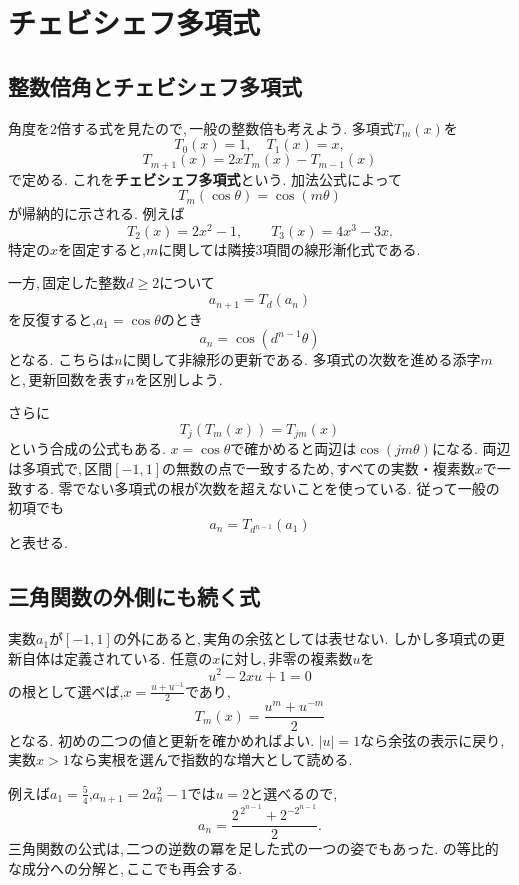 \section{チェビシェフ多項式}\label{節：チェビシェフ多項式}
\subsection{整数倍角とチェビシェフ多項式}

角度を2倍する式を見たので,\,一般の整数倍も考えよう.
多項式$T_m(x)$を
\[
 T_0(x)=1,\quad T_1(x)=x,
\]
\[
 T_{m+1}(x)=2xT_m(x)-T_{m-1}(x)
\]
で定める. これを\textbf{チェビシェフ多項式}という.
加法公式によって
\[
 T_m(\cos\theta)=\cos(m\theta)
\]
が帰納的に示される.
例えば
\[
 T_2(x)=2x^2-1,\qquad T_3(x)=4x^3-3x.
\]
特定の$x$を固定すると,$m$に関しては隣接3項間の線形漸化式である.

一方,\,固定した整数$d\ge2$について
\[
 a_{n+1}=T_d(a_n)
\]
を反復すると,$a_1=\cos\theta$のとき
\[
 a_n=\cos(d^{n-1}\theta)
\]
となる. こちらは$n$に関して非線形の更新である.
多項式の次数を進める添字$m$と,\,更新回数を表す$n$を区別しよう.

さらに
\[
 T_j(T_m(x))=T_{jm}(x)
\]
という合成の公式もある.
$x=\cos\theta$で確かめると両辺は$\cos(jm\theta)$になる.
両辺は多項式で,\,区間$[-1,1]$の無数の点で一致するため,\,すべての実数・複素数$x$で一致する.
零でない多項式の根が次数を超えないことを使っている.
従って一般の初項でも
\[
 a_n=T_{d^{n-1}}(a_1)
\]
と表せる.

\subsection{三角関数の外側にも続く式}

実数$a_1$が$[-1,1]$の外にあると,\,実角の余弦としては表せない.
しかし多項式の更新自体は定義されている.
任意の$x$に対し,\,非零の複素数$u$を
\[
 u^2-2xu+1=0
\]
の根として選べば,$x=\frac{u+u^{-1}}2$であり,
\[
 T_m(x)=\frac{u^m+u^{-m}}2
\]
となる. 初めの二つの値と更新を確かめればよい.
$|u|=1$なら余弦の表示に戻り,\,実数$x>1$なら実根を選んで指数的な増大として読める.

例えば$a_1=\frac54$,$a_{n+1}=2a_n^2-1$では$u=2$と選べるので,
\[
 a_n=\frac{2^{\,2^{n-1}}+2^{-2^{n-1}}}{2}.
\]
三角関数の公式は,\,二つの逆数の冪を足した式の一つの姿でもあった.
の等比的な成分への分解と,\,ここでも再会する.
